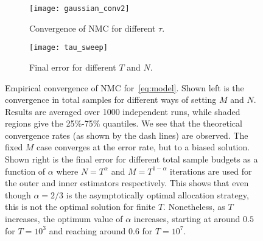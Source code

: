 \begin{figure}[t]
	\centering
	\begin{subfigure}[b]{0.49\textwidth}
		\centering
	\texttt{[image: gaussian\_conv2]}
	\caption{Convergence of NMC for different $\tau$. \label{fig:emprical-conv}}
	\end{subfigure}
	\begin{subfigure}[b]{0.49\textwidth}
		\centering
	\texttt{[image: tau\_sweep]}
		\caption{Final error for different $T$ and $N$.\label{fig:tau_sweep}}
	\end{subfigure}
	\caption{Empirical convergence of NMC for~\eqref{eq:model}.  Shown left is the
		convergence in total samples for different ways of setting $M$ and $N$.  
		Results are averaged over 1000 independent runs, while shaded regions give the 25\%-75\% quantiles. We
		see that the theoretical convergence rates (as shown by the dash lines) are observed. 
		The fixed $M$ case converges at the \mc error rate, but to a biased solution.
		Shown right is the final error for different total sample budgets
		as a function of $\alpha$ where $N=T^{\alpha}$ and $M=T^{1-\alpha}$ iterations are used for the outer
		and inner estimators respectively.  This shows that even though $\alpha=2/3$ is the
		asymptotically optimal allocation strategy, this is not the optimal solution for
		finite $T$. Nonetheless, as $T$ increases, the optimum value of $\alpha$ increases,
		starting at around $0.5$ for $T=10^3$ and reaching around $0.6$ for $T=10^7$. \vspace{-5pt}}
\end{figure}	

